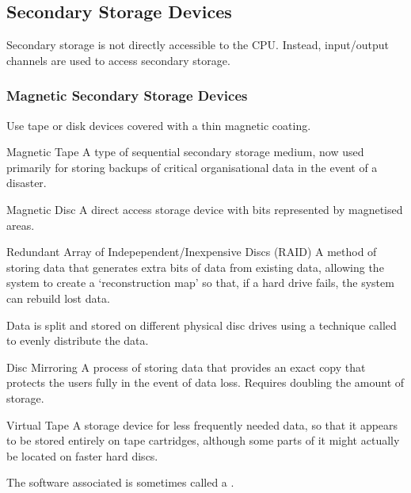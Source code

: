 \documentclass[\main/notes.tex]{subfiles}
\begin{document}
			\subsection{Secondary Storage Devices}
				Secondary storage is not directly accessible to the CPU. Instead, input/output channels are used to access secondary storage.
				\subsubsection{Magnetic Secondary Storage Devices}
					Use tape or disk devices covered with a thin magnetic coating.
					\begin{definition}{Magnetic Tape}
						A type of sequential secondary storage medium, now used primarily for storing backups of critical organisational data in the event of a disaster.
					\end{definition}
					\begin{definition}{Magnetic Disc}
						A direct access storage device with bits represented by magnetised areas.
					\end{definition}
					\begin{definition}{Redundant Array of Indepependent/Inexpensive Discs (RAID)}
						A method of storing data that generates extra bits of data from existing data, allowing the system to create a `reconstruction map' so that, if a hard drive fails, the system can rebuild lost data.

						Data is split and stored on different physical disc drives using a technique called  to evenly distribute the data.
					\end{definition}
					\begin{definition}{Disc Mirroring}
						A process of storing data that provides an exact copy that protects the users fully in the event of data loss. Requires doubling the amount of storage.
					\end{definition}
					\begin{definition}{Virtual Tape}
						A storage device for less frequently needed data, so that it appears to be stored entirely on tape cartridges, although some parts of it might actually be located on faster hard discs.

						The software associated is sometimes called a .
					\end{definition}
\end{document}
